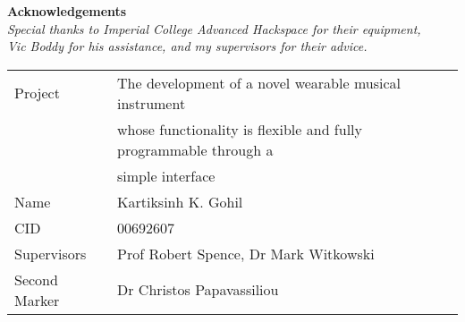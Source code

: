 
\vfill

\begin{center}

\textbf{Acknowledgements}\\
\textit{Special thanks to Imperial College Advanced Hackspace for their equipment,\\Vic Boddy for his assistance, and my supervisors for their advice.}\\

\end{center}
\vspace{40 pt}

\large
\begin{tabular}{|l l}
Project & The development of a novel wearable musical instrument \\
& whose functionality is flexible and fully programmable through a \\ & simple interface \\
Name & Kartiksinh K. Gohil \\
CID & 00692607 \\
Supervisors & Prof Robert Spence, Dr Mark Witkowski \\
Second Marker & Dr Christos Papavassiliou 
\end{tabular}
\normalsize
\newpage